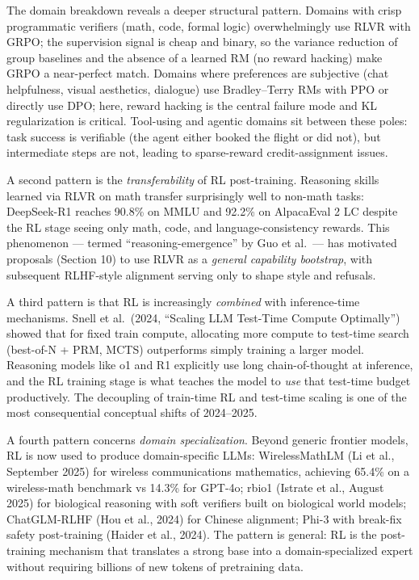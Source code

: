 The domain breakdown reveals a deeper structural pattern. Domains with crisp programmatic verifiers (math, code, formal logic) overwhelmingly use RLVR with GRPO; the supervision signal is cheap and binary, so the variance reduction of group baselines and the absence of a learned RM (no reward hacking) make GRPO a near-perfect match. Domains where preferences are subjective (chat helpfulness, visual aesthetics, dialogue) use Bradley--Terry RMs with PPO or directly use DPO; here, reward hacking is the central failure mode and KL regularization is critical. Tool-using and agentic domains sit between these poles: task success is verifiable (the agent either booked the flight or did not), but intermediate steps are not, leading to sparse-reward credit-assignment issues.

A second pattern is the \emph{transferability} of RL post-training. Reasoning skills learned via RLVR on math transfer surprisingly well to non-math tasks: DeepSeek-R1 reaches 90.8\% on MMLU and 92.2\% on AlpacaEval 2 LC despite the RL stage seeing only math, code, and language-consistency rewards. This phenomenon --- termed ``reasoning-emergence'' by Guo et al.~--- has motivated proposals (Section 10) to use RLVR as a \emph{general capability bootstrap}, with subsequent RLHF-style alignment serving only to shape style and refusals.

A third pattern is that RL is increasingly \emph{combined} with inference-time mechanisms. Snell et al.~(2024, ``Scaling LLM Test-Time Compute Optimally'') showed that for fixed train compute, allocating more compute to test-time search (best-of-N + PRM, MCTS) outperforms simply training a larger model. Reasoning models like o1 and R1 explicitly use long chain-of-thought at inference, and the RL training stage is what teaches the model to \emph{use} that test-time budget productively. The decoupling of train-time RL and test-time scaling is one of the most consequential conceptual shifts of 2024--2025.

A fourth pattern concerns \emph{domain specialization}. Beyond generic frontier models, RL is now used to produce domain-specific LLMs: WirelessMathLM (Li et al., September 2025) for wireless communications mathematics, achieving 65.4\% on a wireless-math benchmark vs 14.3\% for GPT-4o; rbio1 (Istrate et al., August 2025) for biological reasoning with soft verifiers built on biological world models; ChatGLM-RLHF (Hou et al., 2024) for Chinese alignment; Phi-3 with break-fix safety post-training (Haider et al., 2024). The pattern is general: RL is the post-training mechanism that translates a strong base into a domain-specialized expert without requiring billions of new tokens of pretraining data.

